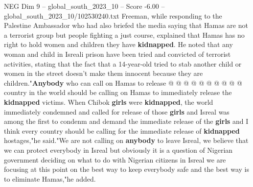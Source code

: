 \begin{textsample}{NEG Dim 9 – global\_south\_2023\_10 – Score -6.00 – global\_south\_2023\_10/102530240.txt}
Freeman, while responding to the Palestine Ambassador who had also briefed the media saying that Hamas are not a terrorist group but people fighting a just course, explained that Hamas has no right to hold women and children they have \textbf{kidnapped}.
He noted that any woman and child in Isreali prison have been tried and convicted of terrorist activities, stating that the fact that a 14-year-old tried to stab another child or women in the street doesn't make them innocent because they are children."\textbf{Anybody} who can call on Hamas to release @ @ @ @ @ @ @ @ @ @ country in the world should be calling on Hamas to immediately release the \textbf{kidnapped} victims.
When Chibok \textbf{girls} were \textbf{kidnapped}, the world immediately condemned and called for release of those \textbf{girls} and Isreal was among the first to condenm and demand the immediate release of the \textbf{girls} and I think every country should be calling for the immediate release of \textbf{kidnapped} hostages,"he said."We are not calling on \textbf{anybody} to leave Isreal, we believe that we can protect everybody in Isreal but obviously it is a question of Nigerian government deciding on what to do with Nigerian citizens in Isreal we are focusing at this point on the best way to keep everybody safe and the best way is to eliminate Hamas,"he added.

\end{textsample}
